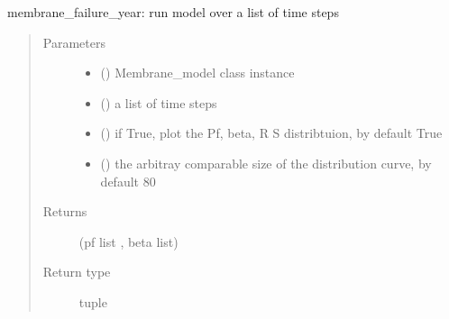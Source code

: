 \documentclass[letterpaper,10pt,english]{sphinxmanual}
\begin{document}

\begin{fulllineitems}
\label{\detokenize{membrane:membrane.membrane_failure_year}}
\sphinxAtStartPar
membrane\_failure\_year: run model over a list of time steps
\begin{quote}\begin{description}
\item[{Parameters}] \leavevmode\begin{itemize}
\item {} 
\sphinxAtStartPar
{} () \textendash{} Membrane\_model class instance

\item {} 
\sphinxAtStartPar
{} (\sphinxstyleliteralemphasis{\sphinxupquote{, }}) \textendash{} a list of time steps

\item {} 
\sphinxAtStartPar
{} (\sphinxstyleliteralemphasis{\sphinxupquote{, }}) \textendash{} if True, plot the Pf, beta, R S distribtuion, by default True

\item {} 
\sphinxAtStartPar
{} (\sphinxstyleliteralemphasis{\sphinxupquote{, }}) \textendash{} the arbitray comparable size of the distribution curve, by default 80

\end{itemize}

\item[{Returns}] \leavevmode
\sphinxAtStartPar
(pf list , beta list)

\item[{Return type}] \leavevmode
\sphinxAtStartPar
tuple

\end{description}\end{quote}

\end{fulllineitems}
\end{document}

